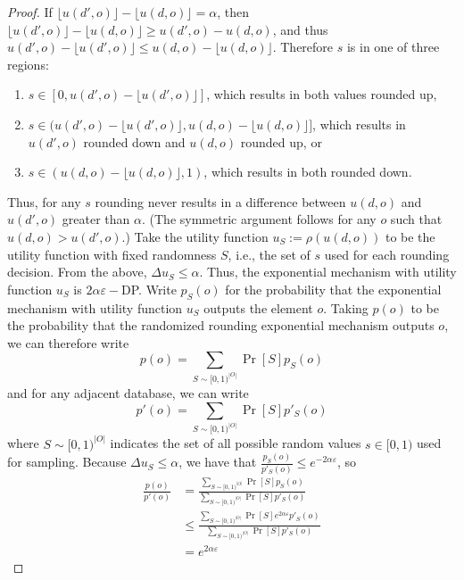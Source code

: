 \documentclass[11pt]{article}
\theoremstyle{definition}
\begin{document}
\begin{proof}
If $\lfloor{u(d',o)} \rfloor - \lfloor{u(d,o)} \rfloor = \alpha$, then $\lfloor{u(d',o)} \rfloor - \lfloor{u(d,o)} \rfloor \geq u(d',o) - u(d,o)$, and thus 
 $u(d',o)-\lfloor{u(d',o)} \rfloor \leq u(d,o)-\lfloor{u(d,o)} \rfloor$. 
Therefore $s$ is  in one of three regions:
\begin{enumerate}[leftmargin=*]
    \item $s \in [0, u(d',o)-\lfloor{u(d',o)} \rfloor]$, which results in both values rounded up,
    \item $s \in (u(d',o)-\lfloor{u(d',o)} \rfloor,u(d,o)-\lfloor{u(d,o)} \rfloor]$, which results in $u(d',o)$ rounded down and $u(d,o)$ rounded up, or
    \item $s \in (u(d,o)-\lfloor{u(d,o)} \rfloor,1)$, which results in both rounded down.
\end{enumerate}
Thus, for any $s$ rounding never results in a  difference between $u(d,o)$ and $u(d',o)$ greater than $\alpha$. (The symmetric argument follows for any $o$ such that $u(d,o)>u(d',o)$.) 
Take the utility function $u_S:=\rho(u(d,o))$ to be the utility function with fixed randomness $S$, i.e., the set of $s$ used for each rounding decision.
From the above, $\Delta u_S \leq \alpha$. Thus, the exponential mechanism with utility function $u_S$ is $2\alpha\varepsilon-$DP. Write $p_S(o)$ for the probability that the exponential mechanism with utility function $u_S$ outputs the element $o$. Taking $p(o)$ to be the probability that the randomized rounding exponential mechanism outputs $o$, we can therefore write
\[p(o) = \sum_{S \sim [0,1)^{|O|}}\Pr[S]p_S(o)\]
and for any adjacent database, we can write
\[p'(o) = \sum_{S \sim [0,1)^{|O|}}\Pr[S]p'_S(o)\]
where $S \sim [0,1)^{|O|}$ indicates the set of all possible random values $s \in [0,1)$ used for sampling. 
Because $\Delta u_S \leq \alpha$, we have that  $\frac{p_S(o)}{p'_S(o)}\leq e^{-2\alpha\varepsilon}$, so
\begin{align*}
  \frac{p(o)}{p'(o)}  &= \frac{\sum_{S \sim [0,1)^{|O|}}\Pr[S]p_S(o)}{ \sum_{S \sim [0,1)^{|O|}}\Pr[S]p'_S(o)} \\ &\leq \frac{\sum_{S \sim [0,1)^{|O|}}\Pr[S]e^{2\alpha\varepsilon}p'_S(o)}{ \sum_{S \sim [0,1)^{|O|}}\Pr[S]p'_S(o)}\\
  & = e^{2\alpha\varepsilon}
\end{align*}


\end{proof}
\end{document}
